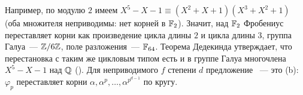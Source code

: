 Например, по модулю $2$ имеем $X^5-X-1\equiv(X^2+X+1)(X^3+X^2+1)$ (оба множителя неприводимы: нет корней в $\mathbb F_2$). Значит,
над $\mathbb F_2$ Фробениус переставляет корни как произведение цикла длины $2$ и цикла длины $3$, группа Галуа~--- $\mathbb Z/6\mathbb Z$,
поле разложения~--- $\mathbb F_{64}$. Теорема Дедекинда утверждает, что перестановка с таким же цикловым типом есть и в группе
Галуа многочлена $X^5-X-1$ над $\mathbb Q$ (). Для неприводимого $f$ степени $d$ предложение ~--- это (b): $\varphi_p$
переставляет корни $\alpha,\alpha^p,\dots,\alpha^{p^{d-1}}$ по кругу.
